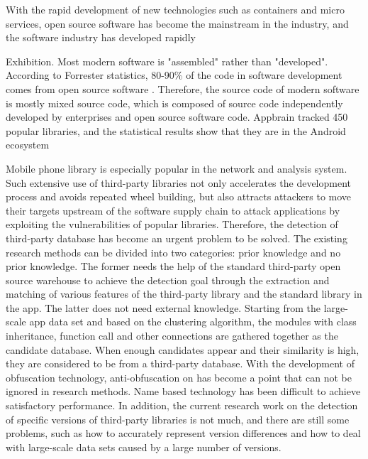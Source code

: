 
\begin{digest}
With the rapid development of new technologies such as containers and micro services, open source software has become the mainstream in the industry, and the software industry has developed rapidly

Exhibition. Most modern software is "assembled" rather than "developed". According to Forrester statistics, 80-90\% of the code in software development comes from open source software \cite{qianxin.com}. Therefore, the source code of modern software is mostly mixed source code, which is composed of source code independently developed by enterprises and open source software code. Appbrain \cite{appbrain} tracked 450 popular libraries, and the statistical results show that they are in the Android ecosystem

Mobile phone library is especially popular in the network and analysis system. Such extensive use of third-party libraries not only accelerates the development process and avoids repeated wheel building, but also attracts attackers to move their targets upstream of the software supply chain to attack applications by exploiting the vulnerabilities of popular libraries. Therefore, the detection of third-party database has become an urgent problem to be solved. The existing research methods can be divided into two categories: prior knowledge and no prior knowledge. The former needs the help of the standard third-party open source warehouse to achieve the detection goal through the extraction and matching of various features of the third-party library and the standard library in the app. The latter does not need external knowledge. Starting from the large-scale app data set and based on the clustering algorithm, the modules with class inheritance, function call and other connections are gathered together as the candidate database. When enough candidates appear and their similarity is high, they are considered to be from a third-party database. With the development of obfuscation technology, anti-obfuscation on has become a point that can not be ignored in research methods. Name based technology has been difficult to achieve satisfactory performance. In addition, the current research work on the detection of specific versions of third-party libraries is not much, and there are still some problems, such as how to accurately represent version differences and how to deal with large-scale data sets caused by a large number of versions.




\end{digest}
